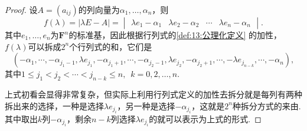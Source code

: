 \begin{proof}
    设$A=(a_{ij})$的列向量为$\alpha_1,\ldots,\alpha_n$，则
    \[f(\lambda)=|\lambda E-A|=\begin{vmatrix}
            \lambda e_1-\alpha_1 & \lambda e_2-\alpha_2 & \cdots & \lambda e_n-\alpha_n
        \end{vmatrix}.\]
    其中$e_1,\ldots,e_n$为$\mathbf{F}^n$的标准基，因此根据行列式的\autoref{def:13:公理化定义} 的加性，$f(\lambda)$可以拆成$2^n$个行列式的和，它们是
    \begin{equation}\label{eq:18:特征多项式展开}
        (-\alpha_1,\cdots,-\alpha_{j_1-1},\lambda e_{j_1},-\alpha_{j_1+1},\cdots,-\alpha_{j_2-1},\lambda e_{j_2},-\alpha_{j_2+1},\cdots,-\lambda e_{j_{n-k}},\cdots,-\alpha_n),
    \end{equation}
    其中$1\leqslant j_1<j_2<\cdots<j_{n-k}\leqslant n,\enspace k=0,2,\ldots,n$.

    上式初看会显得非常复杂，但实际上利用行列式定义的加性去拆分就是每列有两种拆出来的选择，一种是选择$\lambda e_{j_i}$，另一种是选择$-\alpha_{j_i}$，这就是$2^n$种拆分方式的来由. 其中取出$k$列$-\alpha_{j_i}$，剩余$n-k$列选择$\lambda e_{j_i}$的就可以表示为上式的形式.


\end{proof}
